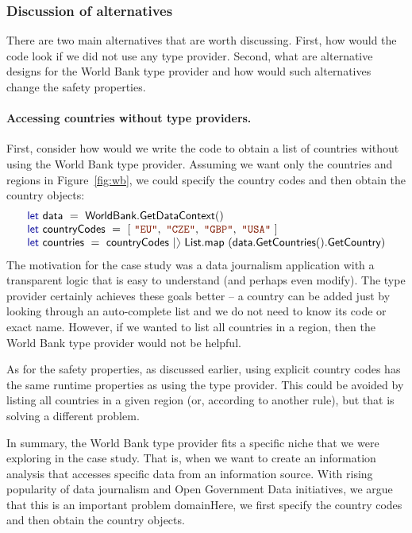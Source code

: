 \documentclass[submission,copyright,creativecommons]{eptcs}
\newcommand{\rangl}{\begin{picture}(4.5,7)
\put(.9,2.5){\rotatebox{120}{\line(1,0){5.5}}}
\put(.9,2.5){\rotatebox{240}{\line(1,0){5.5}}}
\end{picture}}
\newcommand{\kvd}[1]{\textnormal{\textcolor{kvdclr}{\sffamily #1}}}
\newcommand{\str}[1]{\textnormal{\textcolor{strclr}{\ttfamily "#1"}}}
\newcommand{\ident}[1]{\textnormal{\sffamily #1}}
\begin{document}
\subsubsection{Discussion of alternatives}

There are two main alternatives that are worth discussing. First, how would the code look if 
we did not use any type provider. Second, what are alternative designs for the World Bank type 
provider and how would such alternatives change the safety properties. 

\vspace{-1em}
\paragraph{Accessing countries without type providers.} First, consider how would we write the code to obtain a list
of countries without using the World Bank type provider. Assuming we want only the countries and
regions in Figure~\ref{fig:wb}, we could specify the country codes and then obtain the country objects:
%
\begin{equation*}
\begin{array}{l}
 \kvd{let}~\ident{data}~=~\ident{WorldBank.GetDataContext}() \\
 \kvd{let}~\ident{countryCodes}~=~\lbrack~\str{EU},~\str{CZE},~\str{GBP},~\str{USA}~\rbrack \\
 \kvd{let}~\ident{countries}~=~\ident{countryCodes}~|\rangl~\ident{List.map}~(\ident{data.GetCountries}().\ident{GetCountry})
\end{array}
\end{equation*}
%
The motivation for the case study was a data journalism application with a transparent logic
that is easy to understand (and perhaps even modify). The type provider certainly achieves these
goals better -- a country can be added just by looking through an auto-complete list and we do not
need to know its code or exact name. However, if we wanted to list all countries in a region, then
the World Bank type provider would not be helpful. 

As for the safety properties, as discussed earlier, using explicit country codes has the same
runtime properties as using the type provider. This could be avoided by listing all countries in
a given region (or, according to another rule), but that is solving a different problem. 

In summary, the World Bank type provider fits a specific niche that we were exploring in the case 
study. That is, when we want to create an information analysis that accesses specific data from
an information source. With rising popularity of data journalism and Open Government Data
initiatives, we argue that this is an important problem domainHere, we first specify the country 
codes and then obtain the country objects.
\end{document}
